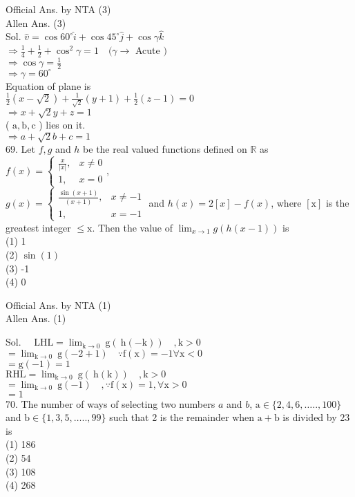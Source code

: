 \documentclass[10pt]{article}
\begin{document}
Official Ans. by NTA (3)\\
Allen Ans. (3)\\
Sol. \(\hat{v}=\cos 60^{\circ} \hat{i}+\cos 45^{\circ} \hat{j}+\cos \gamma \hat{k}\)\\
\(\Rightarrow \frac{1}{4}+\frac{1}{2}+\cos ^{2} \gamma=1 \quad(\gamma \rightarrow\) Acute \()\)\\
\(\Rightarrow \cos \gamma=\frac{1}{2}\)\\
\(\Rightarrow \gamma=60^{\circ}\)\\
Equation of plane is\\
\(\frac{1}{2}(x-\sqrt{2})+\frac{1}{\sqrt{2}}(y+1)+\frac{1}{2}(z-1)=0\)\\
\(\Rightarrow x+\sqrt{2} y+z=1\)\\
( \(\mathrm{a}, \mathrm{b}, \mathrm{c}\) ) lies on it.\\
\(\Rightarrow a+\sqrt{2} b+c=1\)\\
69. Let \(f, g\) and \(h\) be the real valued functions defined on \(\mathbb{R}\) as \(f(x)=\left\{\begin{array}{cc}\frac{x}{|x|}, & x \neq 0 \\ 1, & x=0\end{array}\right.\),\\
\(g(x)=\left\{\begin{array}{cl}\frac{\sin (x+1)}{(x+1)}, & x \neq-1 \\ 1, & x=-1\end{array}\right.\) and \(h(x)=2[x]-f(x)\), where \([\mathrm{x}]\) is the greatest integer \(\leq \mathrm{x}\). Then the value of \(\lim _{x \rightarrow 1} g(h(x-1))\) is\\
(1) 1\\
(2) \(\sin (1)\)\\
(3) -1\\
(4) 0

Official Ans. by NTA (1)\\
Allen Ans. (1)

Sol. \(\quad \mathrm{LHL}=\lim _{\mathrm{k} \rightarrow 0} \mathrm{~g}(\mathrm{~h}(-\mathrm{k})) \quad, \mathrm{k}>0\)\\
\(=\lim _{\mathrm{k} \rightarrow 0} \mathrm{~g}(-2+1) \quad \because \mathrm{f}(\mathrm{x})=-1 \forall \mathrm{x}<0\)\\
\(=\mathrm{g}(-1)=1\)\\
\(\mathrm{RHL}=\lim _{\mathrm{k} \rightarrow 0} \mathrm{~g}(\mathrm{~h}(\mathrm{k})) \quad, \mathrm{k}>0\)\\
\(=\lim _{\mathrm{k} \rightarrow 0} \mathrm{~g}(-1) \quad, \because \mathrm{f}(\mathrm{x})=1, \forall \mathrm{x}>0\)\\
\(=1\)\\
70. The number of ways of selecting two numbers \(a\) and \(b\), \(\mathrm{a} \in\{2,4,6, \ldots . ., 100\} \quad\) and \(\mathrm{b} \in\{1,3,5, \ldots . ., 99\}\) such that 2 is the remainder when \(\mathrm{a}+\mathrm{b}\) is divided by 23 is\\
(1) 186\\
(2) 54\\
(3) 108\\
(4) 268
\end{document}
